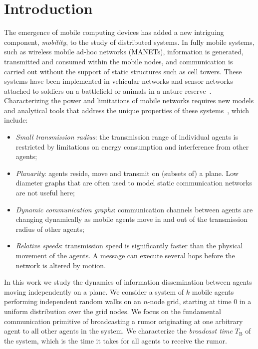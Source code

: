 \documentclass[11pt]{article}
\newcommand{\bt}{T_{\mathrm{B}}}
\begin{document}
\section{Introduction}

The emergence of mobile computing devices has added a new intriguing
component, \emph{mobility}, to the study of distributed systems.
In  fully mobile systems, such as wireless mobile ad-hoc networks (MANETs),
information is generated, transmitted and consumed within the mobile
nodes, and communication is carried out without the support of 
static structures such as cell towers.  These systems have been
implemented in vehicular networks and sensor networks attached to
soldiers on a battlefield or animals in a nature
reserve~\cite{OlariuW09, Gerla05, JuangOWMPR02, Stojmenovic02}.
Characterizing the power and limitations of mobile networks requires
new models and analytical tools that address the unique properties
of these systems~\cite{GrossglauserT02,ClementiPS09}, which include:
\begin{itemize}
\item
\emph{Small transmission radius}: the transmission range of individual agents
is restricted by limitations on energy consumption and interference
from other agents;
\item
\emph{Planarity}: agents reside, move and transmit on (subsets of) a
plane.  Low diameter graphs that are often used to model static
communication networks are not useful here;
\item
\emph{Dynamic communication graphs}: communication channels between
agents are changing dynamically as mobile agents move in and out of
the transmission radius of other agents;
\item
\emph{Relative speeds}: transmission speed is significantly faster
than the physical movement of the agents.  A message can execute several hops
before the network is altered by motion.
\end{itemize}

In this work we study the dynamics of information dissemination
between agents moving independently on a plane.  We consider a system
of $k$ mobile agents performing independent random walks on an
$n$-node grid, starting at time $0$ in a uniform distribution over the
grid nodes.  We focus on the fundamental communication primitive of
broadcasting a rumor originating at one arbitrary agent to all other 
agents in the system.  We characterize the \emph{broadcast time} $\bt$
of the system, which is the time it takes for all agents to receive
the rumor.
\end{document}
